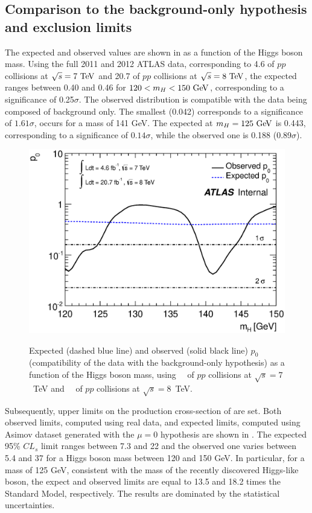 \subsection{Comparison to the background-only hypothesis and exclusion limits} 
The expected and observed \pzero values are shown in 
as a function of the Higgs boson mass. Using the full 2011 and 2012 ATLAS data,
corresponding to 4.6 \ifb of $pp$ collisions at $\rts = 7 \TeV$ and 20.7 \ifb
of $pp$ collisions at $\rts=8\TeV$, the expected \pzero ranges between 0.40
and 0.46 for $120 < m_H < 150 \GeV$, corresponding to a significance of 0.25$\sigma$.
The observed \pzero distribution is compatible with the data being composed of
background only. The smallest \pzero (0.042) corresponds to a significance of
$1.61\sigma$, occurs for a mass of 141 GeV. The expected \pzero at $m_H = 125 \GeV$
is 0.443, corresponding to a significance of $0.14\sigma$, while the observed one
is 0.188 (0.89$\sigma$).

\begin{figure}[!htbp]
\centering
    {\includegraphics[totalheight=9cm,angle=0]{figures/plot_p0}}
    \caption{Expected (dashed blue line) and observed 
      (solid black line) $p_0$ (compatibility of
      the data with the background-only hypothesis) as a function
      of the Higgs boson mass, using \lumiseventev~\ifb\ of $pp$
      collisions at $\sqrt{s}=7$~TeV and \lumieighttev~\ifb\ of $pp$
      collisions at $\sqrt{s}=8$~TeV.}
    \label{fig:ExpectedP0_1}
\end{figure}

Subsequently, upper limits on the production cross-section of \HToZg are set.
Both observed limits, computed using real data, and expected limits, computed using
Asimov dataset generated with the $\mu=0$ hypothesis are shown in 
. The expected 95\% $CL_s$ limit ranges between
7.3 and 22 and the observed one varies between 5.4 and 37 for a Higgs boson
mass between 120 and 150 GeV. In particular, for a mass of 125 GeV, consistent
with the mass of the recently discovered Higgs-like boson, the expect and observed
limits are equal to 13.5 and 18.2 times the Standard Model, respectively. The
results are dominated by the statistical uncertainties.

